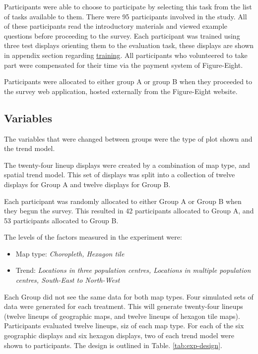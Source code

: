 \documentclass[conference,final,]{IEEEtran}
\providecommand{\tightlist}{%
  \setlength{\itemsep}{0pt}\setlength{\parskip}{0pt}}
\begin{document}
Participants were able to choose to participate by selecting this task from the list of tasks available to them.
There were 95 participants involved in the study. All of these participants read the introductory materials and viewed example questions before proceeding to the survey. Each participant was trained using three test displays orienting them to the evaluation task, these displays are shown in appendix section regarding \protect\hyperlink{training}{training}.
All participants who volunteered to take part were compensated for their time via the payment system of Figure-Eight.

Participants were allocated to either group A or group B when they proceeded to the survey web application, hosted externally from the Figure-Eight website.

\hypertarget{variables}{%
\subsection{Variables}\label{variables}}

The variables that were changed between groups were the type of plot shown and the trend model.

The twenty-four lineup displays were created by a combination of map type, and spatial trend model. This set of displays was split into a collection of twelve displays for Group A and twelve displays for Group B.

Each participant was randomly allocated to either Group A or Group B when they begun the survey. This resulted in 42 participants allocated to Group A, and 53 participants allocated to Group B.

The levels of the factors measured in the experiment were:

\begin{itemize}
\tightlist
\item
  Map type: \emph{Choropleth, Hexagon tile}
\item
  Trend: \emph{Locations in three population centres, Locations in multiple population centres, South-East to North-West}
\end{itemize}

Each Group did not see the same data for both map types. Four simulated sets of data were generated for each treatment.
This will generate twenty-four lineups (twelve lineups of geographic maps, and twelve lineups of hexagon tile maps). Participants evaluated twelve lineups, siz of each map type.
For each of the six geographic displays and six hexagon displays, two of each trend model were shown to participants. The design is outlined in Table. \ref{tab:exp-design}.
\end{document}
